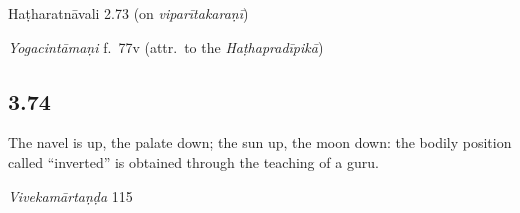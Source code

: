 \begin{ekdosis}
\begin{sources}[hp03_073_2]
\end{sources}

\begin{testimonia}[hp03_073_2]
Haṭharatnāvali 2.73 (on \emph{viparītakaraṇī})
\begin{versinnote}
\end{versinnote}

\emph{Yogacintāmaṇi} f.~77v (attr.~to the \emph{Haṭhapradīpikā})
\begin{versinnote}
\end{versinnote}

\end{testimonia}




\subsection*{3.74}
\begin{translation}[hp03_074]
The navel is up, the palate down; the sun up, the moon down: the bodily position called “inverted” is obtained through the teaching of a guru.
\end{translation}
% 

\begin{sources}[hp03_074]
\emph{Vivekamārtaṇḍa} 115
\begin{versinnote}
\end{versinnote}
\end{sources}


\end{ekdosis}
